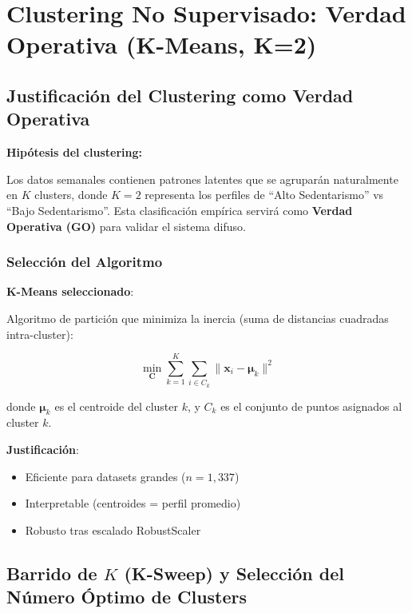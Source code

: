 \documentclass[12pt,letterpaper,twoside]{report}
\newcommand{\vect}[1]{\boldsymbol{#1}}
\newcommand{\mat}[1]{\mathbf{#1}}
\begin{document}
\chapter{Clustering No Supervisado: Verdad Operativa (K-Means, K=2)}

\section{Justificación del Clustering como Verdad Operativa}

\begin{hipotesisbox}
\textbf{Hipótesis del clustering:}

Los datos semanales contienen patrones latentes que se agruparán naturalmente en $K$ clusters, donde $K=2$ representa los perfiles de ``Alto Sedentarismo'' vs ``Bajo Sedentarismo''. Esta clasificación empírica servirá como \textbf{Verdad Operativa (GO)} para validar el sistema difuso.
\end{hipotesisbox}

\subsection{Selección del Algoritmo}

\begin{estadisticobox}
\textbf{K-Means seleccionado}:

Algoritmo de partición que minimiza la inercia (suma de distancias cuadradas intra-cluster):

\begin{equation}
\min_{\mat{C}} \sum_{k=1}^{K} \sum_{i \in C_k} \|\vect{x}_i - \vect{\mu}_k\|^2
\end{equation}

donde $\vect{\mu}_k$ es el centroide del cluster $k$, y $C_k$ es el conjunto de puntos asignados al cluster $k$.

\textbf{Justificación}:
\begin{itemize}[noitemsep]
    \item Eficiente para datasets grandes ($n=1,337$)
    \item Interpretable (centroides = perfil promedio)
    \item Robusto tras escalado RobustScaler
\end{itemize}
\end{estadisticobox}

\section{Barrido de $K$ (K-Sweep) y Selección del Número Óptimo de Clusters}
\end{document}
